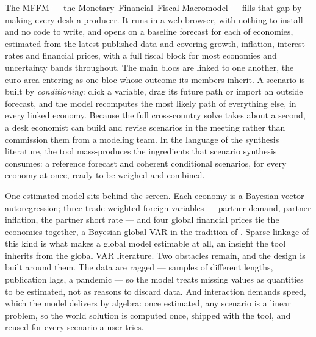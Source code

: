 \documentclass[11pt]{article}
\begin{document}
The MFFM --- the Monetary--Financial--Fiscal Macromodel --- fills that gap by making every
desk a producer. It runs in a web browser, with nothing to install and no code to write, and
opens on a baseline forecast for each of \NModels{} economies, estimated from the latest
published data and covering growth, inflation, interest rates and financial prices, with a
full fiscal block for most economies and uncertainty bands throughout. The \NBlocs{} main
blocs are linked to one another, the euro area entering as one bloc whose outcome its
\NMembers{} members inherit. A scenario is built by \emph{conditioning}: click a variable,
drag its future path or import an outside forecast, and the model recomputes the most likely
path of everything else, in every linked economy. Because the full cross-country solve takes
about a second, a desk economist can build and revise scenarios in the meeting rather than
commission them from a modeling team. In the language of the synthesis literature, the tool
mass-produces the ingredients that scenario synthesis consumes: a reference forecast and
coherent conditional scenarios, for every economy at once, ready to be weighed and
combined.

One estimated model sits behind the screen. Each economy is a Bayesian vector autoregression;
three trade-weighted foreign variables --- partner demand, partner inflation, the partner
short rate --- and four global financial prices tie the economies together, a Bayesian global
VAR in the tradition of \citet{CrespoFeldkircherHuber2016}. Sparse linkage of
this kind is what makes a global model estimable at all, an insight the tool inherits from the
global VAR literature. Two obstacles remain, and the design is built around them. The data are
ragged --- samples of different lengths, publication lags, a pandemic --- so the model treats
missing values as quantities to be estimated, not as reasons to discard data. And interaction
demands speed, which the model delivers by algebra: once estimated, any scenario is a linear
problem, so the world solution is computed once, shipped with the tool, and reused for every
scenario a user tries.
\end{document}
